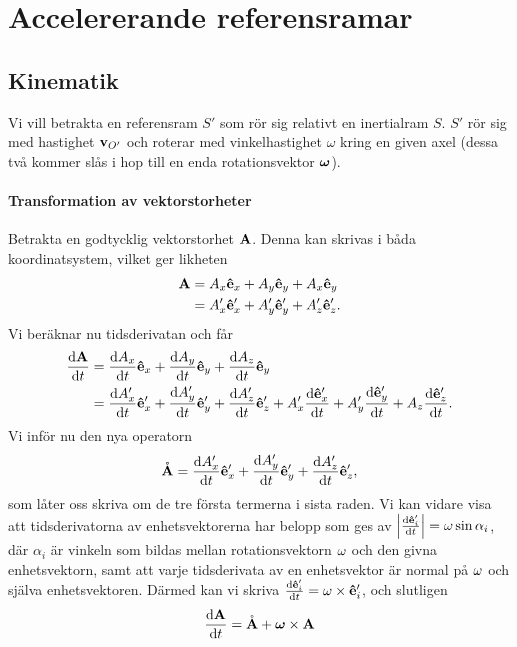 \section{Accelererande referensramar}

\subsection{Kinematik}

Vi vill betrakta en referensram $S'$ som rör sig relativt en inertialram $S$. $S'$ rör sig med hastighet $\vb{v}_{O'}$ och roterar med vinkelhastighet $\omega$ kring en given axel (dessa två kommer slås i hop till en enda rotationsvektor $\vb*{\omega}$).

\paragraph{Transformation av vektorstorheter}
Betrakta en godtycklig vektorstorhet $\vb{A}$. Denna kan skrivas i båda koordinatsystem, vilket ger likheten
\begin{align*}
	\vb{A} &= A_{x}\vu{e}_{x} + A_{y}\vu{e}_{y} + A_{x}\vu{e}_{y} \\
	       &= A_{x}'\vu{e}_{x}' + A_{y}'\vu{e}_{y}' + A_{z}'\vu{e}_{z}'.
\end{align*}
Vi beräknar nu tidsderivatan och får
\begin{align*}
	\dv{\vb{A}}{t} &= \dv{A_{x}}{t}\vu{e}_{x} + \dv{A_{y}}{t}\vu{e}_{y} + \dv{A_{z}}{t}\vu{e}_{y} \\
	       &= \dv{A_{x}'}{t}\vu{e}_{x}' + \dv{A_{y}'}{t}\vu{e}_{y}' + \dv{A_{z}'}{t}\vu{e}_{z}' + A_{x}'\dv{\vu{e}_{x}'}{t} + A_{y}'\dv{\vu{e}_{y}'}{t} + A_{z}\dv{\vu{e}_{z}'}{t}.
\end{align*}
Vi inför nu den nya operatorn
\begin{align*}
	\mathring{\vb{A}} = \dv{A_{x}'}{t}\vu{e}_{x}' + \dv{A_{y}'}{t}\vu{e}_{y}' + \dv{A_{z}'}{t}\vu{e}_{z}',
\end{align*}
som låter oss skriva om de tre första termerna i sista raden. Vi kan vidare visa att tidsderivatorna av enhetsvektorerna har belopp som ges av $\abs{\dv{\vu{e}_{i}'}{t}} = \omega\sin{\alpha_i}$, där $\alpha_i$ är vinkeln som bildas mellan rotationsvektorn $\vb{\omega}$ och den givna enhetsvektorn, samt att varje tidsderivata av en enhetsvektor är normal på $\vb{\omega}$ och själva enhetsvektoren. Därmed kan vi skriva $\dv{\vu{e}_{i}'}{t} = \vb{\omega}\times\vu{e}_{i}'$, och slutligen
\begin{align}
	\dv{\vb{A}}{t} = \mathring{\vb{A}} + \vb*{\omega}\times\vb{A}
	\label{eq:relderiv}
\end{align}

